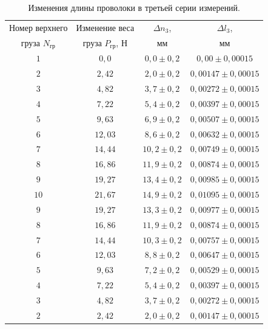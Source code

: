 \documentclass[a4paper,11pt]{article}
\begin{document}
\begin{table}[h!]
\centering
\begin{tabular}{ ||c|c|c|c|| }
  \hline
  Номер верхнего & Изменение веса & $\Delta n_{3}$, & $\Delta l_{3}$, \\
  груза $N_{гр}$ & груза $P_{гр}$, $Н$ & $мм$ & $мм$ \\
  \hline
  $1$ & $0,0$ & $0,0 \pm 0,2$ & $0,00 \pm 0,00015$ \\
  $2$ & $2,42$ & $2,0 \pm 0,2$ & $0,00147 \pm 0,00015$ \\
  $3$ & $4,82$ & $3,7 \pm 0,2$ & $0,00272 \pm 0,00015$ \\
  $4$ & $7,22$ & $5,4 \pm 0,2$ & $0,00397 \pm 0,00015$ \\
  $5$ & $9,63$ & $6,9 \pm 0,2$ & $0,00507 \pm 0,00015$ \\
  $6$ & $12,03$ & $8,6 \pm 0,2$ & $0,00632 \pm 0,00015$ \\
  $7$ & $14,44$ & $10,2 \pm 0,2$ & $0,00749 \pm 0,00015$ \\
  $8$ & $16,86$ & $11,9 \pm 0,2$ & $0,00874 \pm 0,00015$ \\
  $9$ & $19,27$ & $13,4 \pm 0,2$ & $0,00985 \pm 0,00015$ \\
  $10$ & $21,67$ & $14,9 \pm 0,2$ & $0,01095 \pm 0,00015$ \\
  $9$ & $19,27$ & $13,3 \pm 0,2$ & $0,00977 \pm 0,00015$ \\
  $8$ & $16,86$ & $11,9 \pm 0,2$ & $0,00874 \pm 0,00015$ \\
  $7$ & $14,44$ & $10,3 \pm 0,2$ & $0,00757 \pm 0,00015$ \\
  $6$ & $12,03$ & $8,8 \pm 0,2$ & $0,00647 \pm 0,00015$ \\
  $5$ & $9,63$ & $7,2 \pm 0,2$ & $0,00529 \pm 0,00015$ \\
  $4$ & $7,22$ & $5,4 \pm 0,2$ & $0,00397 \pm 0,00015$ \\
  $3$ & $4,82$ & $3,7 \pm 0,2$ & $0,00272 \pm 0,00015$ \\
  $2$ & $2,42$ & $2,0 \pm 0,2$ & $0,00147 \pm 0,00015$ \\
  \hline
\end{tabular}
\caption{Изменения длины проволоки в третьей серии измерений.}
\label{table:tab4}
\end{table}
\end{document}
